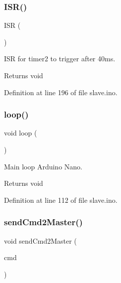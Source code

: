 \subsubsection{\texorpdfstring{ISR()}{ISR()}\hspace{0.1cm}{\footnotesize\ttfamily [2/2]}}
{\footnotesize\ttfamily I\+SR (\begin{DoxyParamCaption}\item[{T\+I\+M\+E\+R2\+\_\+\+C\+O\+M\+P\+B\+\_\+vect}]{ }\end{DoxyParamCaption})}



I\+SR for timer2 to trigger after 40ms. 

\begin{DoxyReturn}{Returns}
void 
\end{DoxyReturn}


Definition at line 196 of file slave.\+ino.

\mbox{\label{slave_8ino_afe461d27b9c48d5921c00d521181f12f}} 
\subsubsection{\texorpdfstring{loop()}{loop()}}
{\footnotesize\ttfamily void loop (\begin{DoxyParamCaption}{ }\end{DoxyParamCaption})}



Main loop Arduino Nano. 

\begin{DoxyReturn}{Returns}
void 
\end{DoxyReturn}


Definition at line 112 of file slave.\+ino.

\mbox{\label{slave_8ino_afaecaf2f7ff3d385786f146797fe3970}} 
\subsubsection{\texorpdfstring{sendCmd2Master()}{sendCmd2Master()}}
{\footnotesize\ttfamily void send\+Cmd2\+Master (\begin{DoxyParamCaption}\item[{unsigned char}]{cmd }\end{DoxyParamCaption})}



